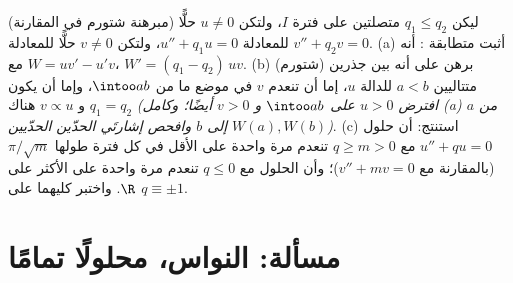 \begin{exercise}[$\star\star\star$]\label{exo:b3:ode:12}
(مبرهنة شتورم في المقارنة) ليكن $q_1 \leq q_2$ متصلتين على
فترة $I$، ولتكن $u \neq 0$ حلًّا للمعادلة $u''
+ q_1u = 0$، ولتكن
$v \neq 0$ حلًّا للمعادلة $v'' + q_2v = 0$.
(a) أثبت متطابقة : أنه مع $W = uv' - u'v$، $W' = (q_1 - q_2)\,uv$.
(b) (شتورم) برهن على أنه بين جذرين متتاليين $a < b$ للدالة $u$،
إما أن تنعدم $v$ في موضع ما من $\intoo ab$، وإما أن يكون
$q_1 = q_2$ و $v \propto u$ هناك \emph{(افترض $u > 0$ على
$\intoo ab$ و $v > 0$ أيضًا؛ وكامل (a) من $a$ إلى $b$ وافحص
إشارتَي الحدّين الحدّيين $W(a),
W(b)$)}.
(c) استنتج: أن حلول $u'' + qu = 0$ مع $q \geq m > 0$ تنعدم مرة
واحدة على الأقل في كل فترة طولها $\pi/\sqrt m$ (بالمقارنة مع
$v'' + mv = 0$)؛ وأن الحلول مع $q \leq 0$ تنعدم مرة واحدة على
الأكثر على $\R$. واختبر كليهما على $q \equiv \pm1$.
\end{exercise}

\section{مسألة: النواس، محلولًا تمامًا}

